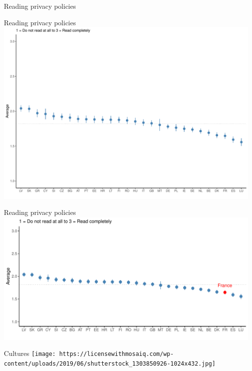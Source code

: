 \documentclass[
  ignorenonframetext,
]{beamer}
\begin{document}
\begin{frame}{Reading privacy policies}
\protect\hypertarget{reading-privacy-policies}{}
\end{frame}

\begin{frame}{Reading privacy policies}
\protect\hypertarget{reading-privacy-policies-1}{}
\includegraphics{slides_files/figure-beamer/unnamed-chunk-4-1.pdf}
\end{frame}

\begin{frame}{Reading privacy policies}
\protect\hypertarget{reading-privacy-policies-2}{}
\includegraphics{slides_files/figure-beamer/unnamed-chunk-5-1.pdf}
\end{frame}

\begin{frame}{Cultures}
\protect\hypertarget{cultures}{}
\texttt{[image: https://licensewithmosaiq.com/wp-content/uploads/2019/06/shutterstock\_1303850926-1024x432.jpg]}
\end{frame}
\end{document}
